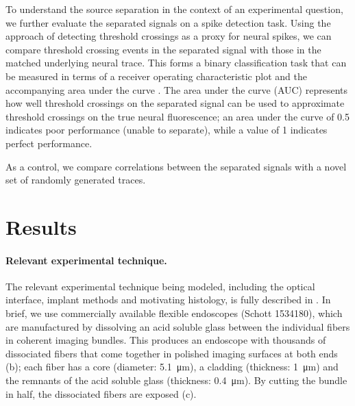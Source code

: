 To understand the source separation in the context of an experimental question, we further evaluate the separated signals on a spike detection task. Using the approach of detecting threshold crossings as a proxy for neural spikes, we can compare threshold crossing events in the separated signal with those in the matched underlying neural trace. This forms a binary classification task that can be measured in terms of a receiver operating characteristic plot and the accompanying area under the curve \cite{Hanley:te}. The area under the curve (AUC) represents how well threshold crossings on the separated signal can be used to approximate threshold crossings on the true neural fluorescence; an area under the curve of 0.5 indicates poor performance (unable to separate), while a value of 1 indicates perfect performance.

As a control, we compare correlations between the separated signals with a novel set of randomly generated traces.

\section{Results}

\paragraph{Relevant experimental technique.} The relevant experimental technique being modeled, including the optical interface, implant methods and motivating histology, is fully described in \cite{Perkins:2018ae}. In brief, we use commercially available flexible endoscopes (Schott 1534180), which are manufactured by dissolving an acid soluble glass between the individual fibers in coherent imaging bundles. This produces an endoscope with thousands of dissociated fibers that come together in polished imaging surfaces at both ends (b); each fiber has a core (diameter: 5.1~\si{\micro\meter}), a cladding (thickness: 1~\si{\micro\meter}) and the remnants of the acid soluble glass (thickness: 0.4~\si{\micro\meter}). By cutting the bundle in half, the dissociated fibers are exposed (c). 


